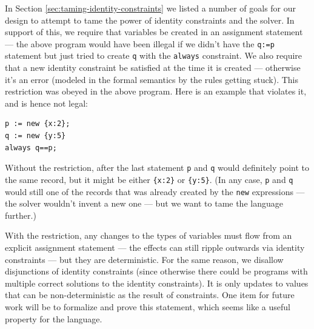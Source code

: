 \documentclass{article}
\begin{document}
In Section \ref{sec:taming-identity-constraints} we listed a number of
goals for our design to attempt to tame the power of identity
constraints and the solver.  In support of this, we require that
variables be created in an assignment statement --- the above program
would have been illegal if we didn't have the \verb|q:=p| statement
but just tried to create \verb|q| with the \verb|always| constraint.
We also require that a new identity constraint be satisfied at the
time it is created --- otherwise it's an error (modeled in the formal
semantics by the rules getting stuck).  This restriction was obeyed in
the above program.  Here is an example that violates it, and is hence
not legal:
\begin{verbatim}
p := new {x:2};
q := new {y:5}
always q==p;
\end{verbatim}

Without the restriction, after the last statement \verb|p| and
\verb|q| would definitely point to the same record, but it might be
either \verb|{x:2}| or \verb|{y:5}|.  (In any case, \verb|p| and
\verb|q| would still one of the records that was already created by
the \verb|new| expressions --- the solver wouldn't invent a new one ---
but we want to tame the language further.)  

With the restriction, any changes to the types of variables must flow
from an explicit assignment statement --- the effects can still ripple
outwards via identity constraints --- but they are deterministic.  For
the same reason, we disallow disjunctions of identity constraints
(since otherwise there could be programs with multiple correct
solutions to the identity constraints).  It is only updates to values
that can be non-deterministic as the result of constraints.  One item
for future work will be to formalize and prove this statement, which
seems like a useful property for the language.



\end{document}
